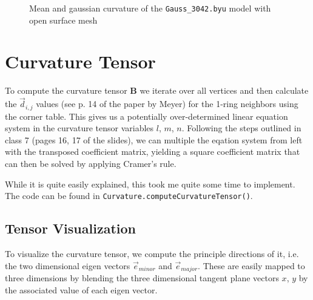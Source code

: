 \documentclass[a4paper,10pt,notitlepage]{scrreprt}
\newcommand{\mat}[1]{\mathbf{#1}}
\begin{document}
\begin{figure}
 \caption{Mean and gaussian curvature of the \texttt{Gauss\_3042.byu} model with
open surface mesh}
 \label{fig:curvature-gauss}
\end{figure}

\section{Curvature Tensor}

To compute the curvature tensor $\mat{B}$ we iterate over all vertices and
then calculate the $\vec{d}_{i,j}$ values (see p. 14 of the paper by Meyer) for
the 1-ring neighbors using the corner table. This gives us a potentially
over-determined linear equation system in the curvature tensor variables $l$,
$m$, $n$. Following the steps outlined in class 7 (pages 16, 17 of the slides),
we can multiple the eqation system from left with the transposed coefficient
matrix, yielding a square coefficient matrix that can then be solved by
applying Cramer's rule.

While it is quite easily explained, this took me quite some time to implement.
The code can be found in \texttt{Curvature.computeCurvatureTensor()}.

\subsection{Tensor Visualization}

To visualize the curvature tensor, we compute the principle directions of it,
i.e. the two dimensional eigen vectors $\vec{e}_{minor}$ and $\vec{e}_{major}$.
These are easily mapped to three dimensions by blending the three dimensional
tangent plane vectors $x$, $y$ by the associated value of each eigen vector.
\end{document}
